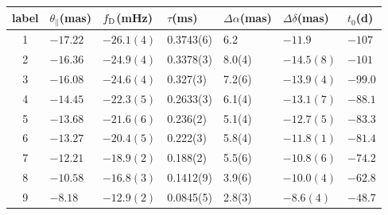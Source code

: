 \documentclass[useAMS,usenatbib]{mn2e}
\begin{document}
\begin{table}
\centering
\begin{tabular}{c|llllll}
\hline
label & $\theta_{\parallel}$(mas) & $f_{\rm D}$(mHz) & $\tau$(ms)  & $\Delta\alpha$(mas) & $\Delta\delta$(mas) & $t_0$(d)\\
\hline
1& $-17.22$   & $-26.1(4)$    & 0.3743(6)         & 6.2    & $-11.9$      & $-107$                               \\
2& $-16.36$  & $-24.9(4)$      & 0.3378(3)         & 8.0(4)  & $-14.5(8)$      &$-101$                                \\
3& $-16.08$   & $-24.6(4)$       & 0.327(3)   & 7.2(6)  & $-13.9(4)$       & $-99.0$                                \\
4& $-14.45$   & $-22.3(5)$      & 0.2633(3)    & 6.1(4)  & $-13.1(7)$     & $-88.1$                                \\
5& $-13.68$ & $-21.6(6)$        & 0.236(2)    & 5.1(4)  & $-12.7(5)$      & $-83.3$                                \\
6& $-13.27$ & $-20.4(5)$      & 0.222(3)     & 5.8(4)  & $-11.8(1)$    & $-81.4$                                \\
7& $-12.21$   & $-18.9(2)$      & 0.188(2)   & 5.5(6) & $-10.8(6)$      & $-74.2$                        \\
8& $-10.58$   & $-16.8(3)$      & 0.1412(9)  & 3.9(6) & $-10.0(4)$      & $-62.8$                                \\
9& $-8.18$   & $-12.9(2)$      & 0.0845(5) & 2.8(3)  & $-8.6(4)$      & $-48.7$                                
\\ \hline


\end{tabular}
\end{table}
\end{document}
